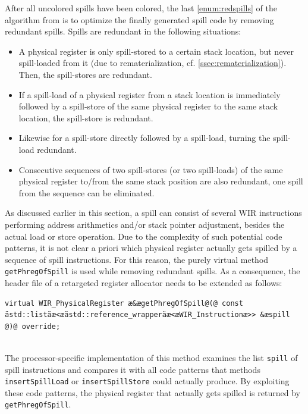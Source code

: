After all uncolored spills have been colored, the last \cref{enum:redspills} of the algorithm from  is to optimize the finally generated spill code by removing redundant spills.
Spills are redundant in the following situations:
\begin{itemize}
  \item A physical register is only spill-stored to a certain stack location, but never spill-loaded from it (due to rematerialization, cf. \cref{ssec:rematerialization}).
  Then, the spill-stores are redundant.
  \item If a spill-load of a physical register from a stack location is immediately followed by a spill-store of the same physical register to the same stack location, the spill-store is redundant.
  \item Likewise for a spill-store directly followed by a spill-load, turning the spill-load redundant.
  \item Consecutive sequences of two spill-stores (or two spill-loads) of the same physical register to/from the same stack position are also redundant, one spill from the sequence can be eliminated.
\end{itemize}

As discussed earlier in this section, a spill can consist of several \gls{WIR} instructions performing address arithmetics and/or stack pointer adjustment, besides the actual load or store operation.
Due to the complexity of such potential code patterns, it is not clear a priori which physical register actually gets spilled by a sequence of spill instructions.
For this reason, the purely virtual method \texttt{getPhregOfSpill} is used while removing redundant spills.
As a consequence, the header file of a retargeted register allocator needs to be extended as follows: \\
\begin{lstlisting}[style=code,float=!ht,aboveskip=-0.8 \baselineskip,belowskip=-0.8 \baselineskip]
virtual WIR_PhysicalRegister æ&ægetPhregOfSpill@(@ const ästd::listäæ<æästd::reference_wrapperäæ<æWIR_Instructionæ>> &æspill @)@ override;
\end{lstlisting}
\\
The processor-specific implementation of this method examines the list \texttt{spill} of spill instructions and compares it with all code patterns that methods \texttt{insertSpillLoad} or \texttt{insertSpillStore} could actually produce.
By exploiting these code patterns, the physical register that actually gets spilled is returned by \texttt{getPhregOfSpill}.


